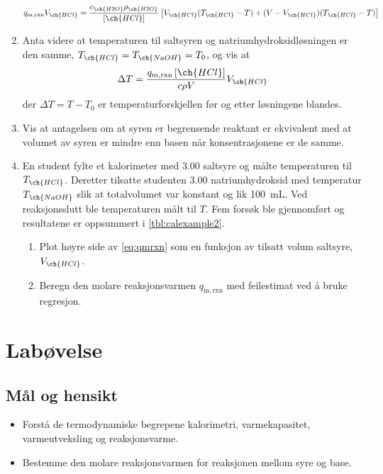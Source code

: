 \begin{enumerate}[label=\alph*)]
		\begin{equation}
			q_\mathrm{m, rxn}V_{\ch{HCl}} = \frac{c_{\ch{H2O}}\rho_{\ch{H2O}}}{\left[\ch{HCl}\right]}\left[V_{\ch{HCl}}(T_{\ch{HCl}}-T)+(V-V_{\ch{HCl}})(T_{\ch{HCl}}-T)\right] \label{eq:qmrxn}
		\end{equation}
		\item Anta videre at temperaturen til saltsyren og natriumhydroksidløsningen er den samme, $T_{\ch{HCl}}=T_{\ch{NaOH}}=T_0$, og vis at
		\begin{equation}
			\Delta T = \frac{q_\mathrm{m, rxn}\left[\ch{HCl}\right]}{c\rho V}V_{\ch{HCl}}
		\end{equation}
		der $\Delta T=T - T_0$ er temperaturforskjellen før og etter løsningene blandes.
		
		\item Vis at antagelsen om at syren er begrensende reaktant er ekvivalent med at volumet av syren er mindre enn basen når konsentrasjonene er de samme.
		
		\item En student fylte et kalorimeter med \SI{3.00}{\molar} saltsyre og målte temperaturen til $T_{\ch{HCl}}$.
		Deretter tilsatte studenten \SI{3.00}{\molar} natriumhydroksid med temperatur $T_{\ch{NaOH}}$ slik at totalvolumet var konstant og lik \SI{100}{\milli\liter}.
		Ved reaksjonsslutt ble temperaturen målt til $T$.
		Fem forsøk ble gjennomført og resultatene er oppsummert i \cref{tbl:calexample2}.
		\begin{enumerate}[label=\roman*)]
			\item Plot høyre side av \cref{eq:qmrxn} som en funksjon av tilsatt volum saltsyre, $V_{\ch{HCl}}$.
			\item Beregn den molare reaksjonsvarmen $q_\mathrm{m, rxn}$ med feilestimat ved å bruke regresjon.
		\end{enumerate}	
	\end{enumerate}
	
	\clearpage
	\section{Labøvelse}
	
	\subsection{Mål og hensikt}
	\begin{itemize}
		\item Forstå de termodynamiske begrepene kalorimetri, varmekapasitet, varmeutveksling og reaksjonsvarme.
		
		\item Bestemme den molare reaksjonsvarmen for reaksjonen mellom syre og base.
	\end{itemize}

